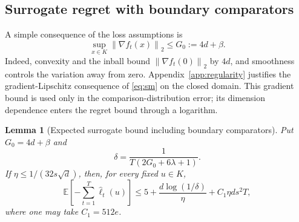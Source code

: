 \documentclass[11pt]{article}
\numberwithin{equation}{section}
\newcommand{\E}{\mathbb E}
\newcommand{\norm}[1]{\left\|#1\right\|}
\newtheorem{lemma}[theorem]{Lemma}
\theoremstyle{definition}
\theoremstyle{remark}
\begin{document}
\subsection{Surrogate regret with boundary comparators}
A simple consequence of the loss assumptions is
\begin{equation}\label{eq:globalG}
 \sup_{x\in K}\norm{\nabla f_t(x)}_2\leq G_0:=4d+\beta.
\end{equation}
Indeed, convexity and the inball bound $\norm{\nabla f_t(0)}_2$ by $4d$, and
smoothness controls the variation away from zero. Appendix~\ref{app:regularity}
justifies the gradient-Lipschitz consequence of \eqref{eq:sm} on the closed
domain. This gradient bound is used only in the comparison-distribution error;
its dimension dependence enters the regret bound through a logarithm.
\begin{lemma}[Expected surrogate bound including boundary comparators]
\label{lem:surreg}
Put $G_0=4d+\beta$ and
\begin{equation}\label{eq:delta}
 \delta=\frac1{T(2G_0+6\lambda+1)}.
\end{equation}
If $\eta\leq1/(32s\sqrt d)$, then, for every fixed $u\in K$,
\begin{equation}\label{eq:surreg}
 \E\left[-\sum_{t=1}^T\widehat\ell_t(u)\right]
 \leq5+\frac{d\log(1/\delta)}\eta+C_1\eta d s^2T,
\end{equation}
where one may take $C_1=512e$.
\end{lemma}
\end{document}
